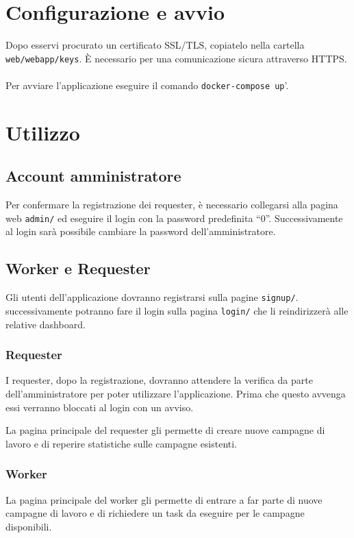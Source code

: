 \documentclass[a4paper]{article}
\begin{document}
\section{Configurazione e avvio}
Dopo esservi procurato un certificato SSL/TLS, copiatelo nella cartella \verb|web/webapp/keys|. \`E necessario per una comunicazione sicura attraverso HTTPS.\\\\
Per avviare l'applicazione eseguire il comando \verb|docker-compose up|'.

\section{Utilizzo}
\subsection{Account amministratore}
Per confermare la registrazione dei requester, \`e necessario collegarsi alla pagina web \verb|admin/| ed eseguire il login con la password predefinita  ``$0$''. Successivamente al login sar\`a possibile cambiare la password dell'amministratore.

\subsection{Worker e Requester}
Gli utenti dell'applicazione dovranno registrarsi sulla pagine \verb|signup/|.
successivamente potranno fare il login sulla pagina \verb|login/| che li reindirizzer\`a alle relative dashboard.

\subsubsection{Requester}
I requester, dopo la registrazione, dovranno attendere la verifica da parte dell'amministratore per poter utilizzare l'applicazione. Prima che questo avvenga essi verranno bloccati al login con un avviso.

La pagina principale del requester gli permette di creare nuove campagne di lavoro e di reperire statistiche sulle campagne esistenti.

\subsubsection{Worker}
La pagina principale del worker gli permette di entrare a far parte di nuove campagne di lavoro e di richiedere un task da eseguire per le campagne disponibili.
\end{document}
